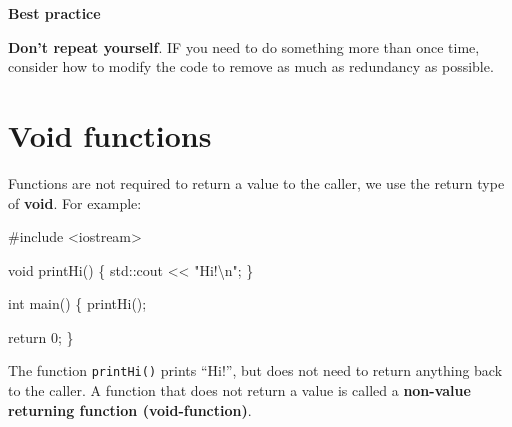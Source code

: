 \documentclass[
  letterpaper,
  DIV=11,
  numbers=noendperiod]{scrreprt}
\newenvironment{Shaded}{\begin{snugshade}}{\end{snugshade}}
\newcommand{\CommentTok}[1]{\textcolor[rgb]{0.37,0.37,0.37}{#1}}
\newcommand{\DecValTok}[1]{\textcolor[rgb]{0.68,0.00,0.00}{#1}}
\newcommand{\ErrorTok}[1]{\textcolor[rgb]{0.68,0.00,0.00}{#1}}
\newcommand{\FunctionTok}[1]{\textcolor[rgb]{0.28,0.35,0.67}{#1}}
\newcommand{\NormalTok}[1]{\textcolor[rgb]{0.00,0.23,0.31}{#1}}
\newcommand{\SpecialCharTok}[1]{\textcolor[rgb]{0.37,0.37,0.37}{#1}}
\newcommand{\StringTok}[1]{\textcolor[rgb]{0.13,0.47,0.30}{#1}}
\begin{document}
\begin{tcolorbox}[enhanced jigsaw, toprule=.15mm, rightrule=.15mm, opacityback=0, breakable, leftrule=.75mm, colback=white, colframe=quarto-callout-tip-color-frame, arc=.35mm, left=2mm, bottomrule=.15mm]
\begin{minipage}[t]{5.5mm}
\textcolor{quarto-callout-tip-color}{\faLightbulb}
\end{minipage}%
\begin{minipage}[t]{\textwidth - 5.5mm}

\textbf{Best practice}\vspace{2mm}

\textbf{Don't repeat yourself}. IF you need to do something more than
once time, consider how to modify the code to remove as much as
redundancy as possible.

\end{minipage}%
\end{tcolorbox}

\hypertarget{void-functions}{%
\section{Void functions}\label{void-functions}}

Functions are not required to return a value to the caller, we use the
return type of \textbf{void}. For example:

\begin{Shaded}
\begin{Highlighting}[]
\CommentTok{\#include \textless{}iostream\textgreater{}}

\NormalTok{void }\FunctionTok{printHi}\NormalTok{()}
\NormalTok{\{}
\NormalTok{    std}\SpecialCharTok{::}\NormalTok{cout }\SpecialCharTok{\textless{}}\ErrorTok{\textless{}} \StringTok{"Hi!}\SpecialCharTok{\textbackslash{}n}\StringTok{"}\NormalTok{;}
\NormalTok{\}}

\NormalTok{int }\FunctionTok{main}\NormalTok{()}
\NormalTok{\{}
    \FunctionTok{printHi}\NormalTok{();}

\NormalTok{    return }\DecValTok{0}\NormalTok{;}
\NormalTok{\}}
\end{Highlighting}
\end{Shaded}

The function \texttt{printHi()} prints ``Hi!'', but does not need to
return anything back to the caller. A function that does not return a
value is called a \textbf{non-value returning function (void-function)}.
\end{document}
